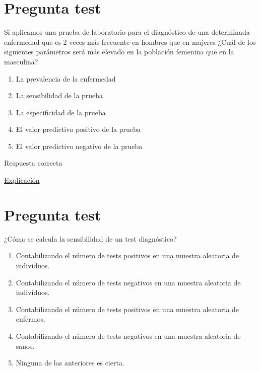 \documentclass[
]{book}
\providecommand{\tightlist}{%
  \setlength{\itemsep}{0pt}\setlength{\parskip}{0pt}}
\begin{document}
\hypertarget{pregunta-test-165}{%
\section{Pregunta test}\label{pregunta-test-165}}

Si aplicamos una prueba de laboratorio para el diagnóstico de una determinada enfermedad que es 2 veces más frecuente en hombres que en mujeres ¿Cuál de los siguientes parámetros será más elevado en la población femenina que en la masculina?

\begin{enumerate}
\def\labelenumi{\alph{enumi})}
\tightlist
\item
  La prevalencia de la enfermedad
\item
  La sensibilidad de la prueba
\item
  La especificidad de la prueba
\item
  El valor predictivo positivo de la prueba
\item
  El valor predictivo negativo de la prueba
\end{enumerate}

Respuesta correcta

\href{https://1fjmanzano.github.io/bioestadistica/relaci\%C3\%B3n-entre-variables-cualitativas.html\#diagno\%CC\%81stico-cli\%CC\%81nico}{Explicación}

\hypertarget{pregunta-test-166}{%
\section{Pregunta test}\label{pregunta-test-166}}

¿Cómo se calcula la sensibilidad de un test diagnóstico?

\begin{enumerate}
\def\labelenumi{\alph{enumi})}
\tightlist
\item
  Contabilizando el número de tests positivos en una muestra aleatoria de individuos.
\item
  Contabilizando el número de tests negativos en una muestra aleatoria de individuos.
\item
  Contabilizando el número de tests positivos en una muestra aleatoria de enfermos.
\item
  Contabilizando el número de tests negativos en una muestra aleatoria de sanos.
\item
  Ninguna de las anteriores es cierta.
\end{enumerate}
\end{document}
